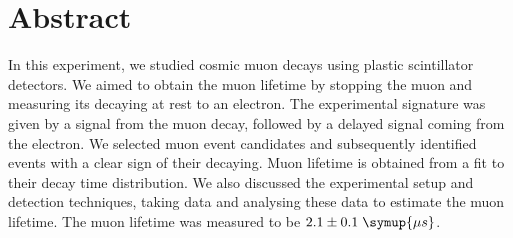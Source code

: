 \thispagestyle{plain}
\section*{Abstract}
In this experiment, we studied cosmic muon decays using plastic scintillator detectors.
We aimed to obtain the muon lifetime by stopping the muon and measuring its decaying at 
rest to an electron. The experimental signature was given by a signal from the muon decay,
followed by a delayed signal coming from the electron. We selected muon event candidates 
and subsequently identified events with a clear sign of their decaying. Muon lifetime
is obtained from a fit to their decay time distribution. We also discussed the experimental
setup and detection techniques, taking data and analysing these data to estimate the muon 
lifetime. The muon lifetime was measured to be $2.1 \pm 0.1 \; \symup{\mu s}$.
